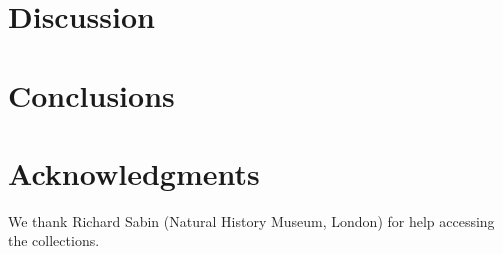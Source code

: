 \documentclass[12pt,a4paper]{article}
\begin{document}
\section{Discussion}


\section{Conclusions}
	

\section{Acknowledgments}
	We thank Richard Sabin (Natural History Museum, London) for help accessing the collections.
	
% 
% 
\end{document}
